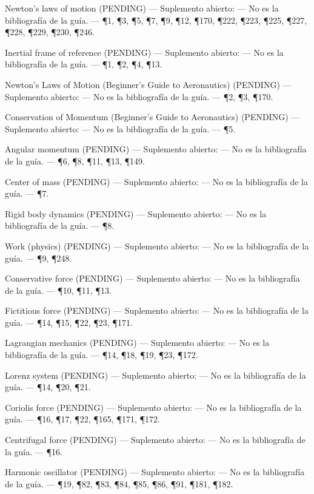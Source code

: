 \documentclass[10pt,openany]{book}
\begin{document}
\medskip
\noindent Newton's laws of motion (PENDING) --- Suplemento abierto: --- No es la bibliografía de la guía. --- \P1, \P3, \P5, \P7, \P9, \P12, \P170, \P222, \P223, \P225, \P227, \P228, \P229, \P230, \P246.\par
\noindent Inertial frame of reference (PENDING) --- Suplemento abierto: --- No es la bibliografía de la guía. --- \P1, \P2, \P4, \P13.\par
\noindent Newton's Laws of Motion (Beginner's Guide to Aeronautics) (PENDING) --- Suplemento abierto: --- No es la bibliografía de la guía. --- \P2, \P3, \P170.\par
\noindent Conservation of Momentum (Beginner's Guide to Aeronautics) (PENDING) --- Suplemento abierto: --- No es la bibliografía de la guía. --- \P5.\par
\noindent Angular momentum (PENDING) --- Suplemento abierto: --- No es la bibliografía de la guía. --- \P6, \P8, \P11, \P13, \P149.\par
\noindent Center of mass (PENDING) --- Suplemento abierto: --- No es la bibliografía de la guía. --- \P7.\par
\noindent Rigid body dynamics (PENDING) --- Suplemento abierto: --- No es la bibliografía de la guía. --- \P8.\par
\noindent Work (physics) (PENDING) --- Suplemento abierto: --- No es la bibliografía de la guía. --- \P9, \P248.\par
\noindent Conservative force (PENDING) --- Suplemento abierto: --- No es la bibliografía de la guía. --- \P10, \P11, \P13.\par
\noindent Fictitious force (PENDING) --- Suplemento abierto: --- No es la bibliografía de la guía. --- \P14, \P15, \P22, \P23, \P171.\par
\noindent Lagrangian mechanics (PENDING) --- Suplemento abierto: --- No es la bibliografía de la guía. --- \P14, \P18, \P19, \P23, \P172.\par
\noindent Lorenz system (PENDING) --- Suplemento abierto: --- No es la bibliografía de la guía. --- \P14, \P20, \P21.\par
\noindent Coriolis force (PENDING) --- Suplemento abierto: --- No es la bibliografía de la guía. --- \P16, \P17, \P22, \P165, \P171, \P172.\par
\noindent Centrifugal force (PENDING) --- Suplemento abierto: --- No es la bibliografía de la guía. --- \P16.\par
\noindent Harmonic oscillator (PENDING) --- Suplemento abierto: --- No es la bibliografía de la guía. --- \P19, \P82, \P83, \P84, \P85, \P86, \P91, \P181, \P182.\par
\end{document}
